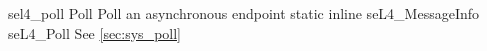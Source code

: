 %
%
%
%

\apidoc
{sel4_poll}
{Poll}
{Poll an asynchronous endpoint}
{static inline seL4\_MessageInfo seL4\_Poll}
{
}
{\messageinforetdesc}
{See \autoref{sec:sys_poll}}
